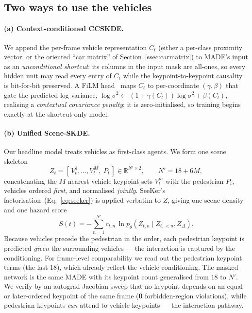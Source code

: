 \documentclass{article}
\begin{document}
\subsection{Two ways to use the vehicles}
\paragraph{(a) Context-conditioned CCSKDE.} We append the per-frame vehicle
representation $C_t$ (either a per-class proximity vector, or the oriented
``car matrix'' of Section~\ref{ssec:carmatrix}) to MADE's input as an
\emph{unconditional shortcut}: its columns in the input mask are all-ones, so
every hidden unit may read every entry of $C_t$ while the keypoint-to-keypoint
causality is bit-for-bit preserved. A FiLM head~\citep{perez2018film} maps $C_t$
to per-coordinate $(\gamma,\beta)$ that gate the predicted log-variance,
$\log\sigma^2\leftarrow(1{+}\gamma(C_t))\log\sigma^2+\beta(C_t)$, realising a
\emph{contextual covariance penalty}; it is zero-initialised, so training begins
exactly at the shortcut-only model.

\paragraph{(b) Unified Scene-SKDE.} Our headline model treats vehicles as
first-class agents. We form one scene skeleton
\begin{equation}
\label{eq:scene}
Z_t=[\,V^1_t,\dots,V^M_t,\;P_t\,]\in\mathbb{R}^{N'\times 2},\qquad N'=18+6M,
\end{equation}
concatenating the $M$ nearest vehicle keypoint sets $V^m_t$ with the pedestrian
$P_t$, vehicles ordered \emph{first}, and normalised \emph{jointly}. SeeKer's
factorisation~(Eq.~\ref{eq:seeker}) is applied verbatim to $Z$, giving one scene
density and one hazard score
\begin{equation}
\label{eq:scene_score}
S(t)=-\sum_{n=1}^{N'} c_{t,n}\,\ln p_\theta\!\left(Z_{t,n}\mid Z_{t,<n},Z_\Delta\right).
\end{equation}
Because vehicles precede the pedestrian in the order, each pedestrian keypoint is
predicted \emph{given} the surrounding vehicles --- the interaction is captured by
the conditioning. For frame-level comparability we read out the pedestrian
keypoint terms (the last 18), which already reflect the vehicle conditioning. The
masked network is the same MADE with its keypoint count generalised from $18$ to
$N'$. We verify by an autograd Jacobian sweep that no keypoint depends on an
equal- or later-ordered keypoint of the same frame (\textbf{0} forbidden-region
violations), while pedestrian keypoints \emph{can} attend to vehicle keypoints
--- the interaction pathway.
\end{document}
